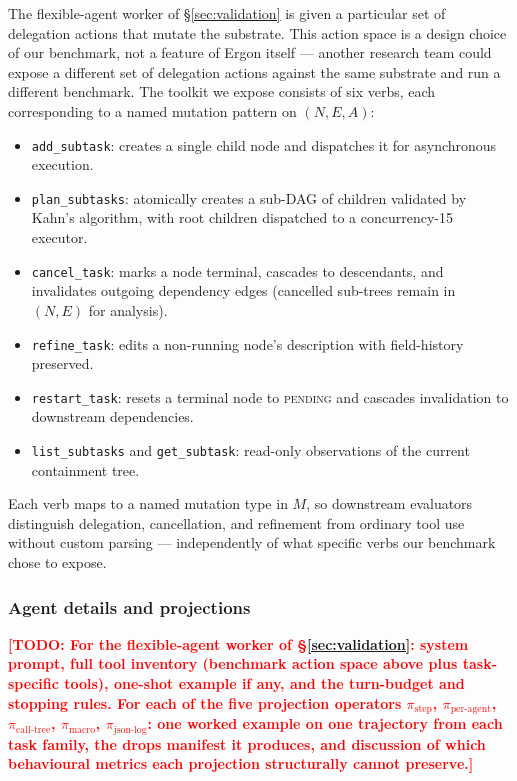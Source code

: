 \documentclass{article}
\newcommand{\todo}[1]{\textcolor{red}{\textbf{[TODO: #1]}}}
\begin{document}
The flexible-agent worker of \S\ref{sec:validation} is given a
particular set of delegation actions that mutate the substrate.
This action space is a design choice of our benchmark, not a
feature of Ergon itself --- another research team could expose a
different set of delegation actions against the same substrate
and run a different benchmark. The toolkit we expose consists of
six verbs, each corresponding to a named mutation pattern on
$(N, E, A)$:
\begin{itemize}\itemsep 0pt
  \item \texttt{add\_subtask}: creates a single child node and
    dispatches it for asynchronous execution.
  \item \texttt{plan\_subtasks}: atomically creates a sub-DAG of
    children validated by Kahn's algorithm, with root children
    dispatched to a concurrency-15 executor.
  \item \texttt{cancel\_task}: marks a node terminal, cascades to
    descendants, and invalidates outgoing dependency edges
    (cancelled sub-trees remain in $(N, E)$ for analysis).
  \item \texttt{refine\_task}: edits a non-running node's
    description with field-history preserved.
  \item \texttt{restart\_task}: resets a terminal node to
    \textsc{pending} and cascades invalidation to downstream
    dependencies.
  \item \texttt{list\_subtasks} and \texttt{get\_subtask}:
    read-only observations of the current containment tree.
\end{itemize}
Each verb maps to a named mutation type in $M$, so downstream
evaluators distinguish delegation, cancellation, and refinement
from ordinary tool use without custom parsing --- independently
of what specific verbs our benchmark chose to expose.

\subsubsection{Agent details and projections}

\todo{For the flexible-agent worker of \S\ref{sec:validation}:
system prompt, full tool inventory (benchmark action space above
plus task-specific tools), one-shot example if any, and the
turn-budget and stopping rules. For each of the five projection
operators $\pi_{\text{step}}$, $\pi_{\text{per-agent}}$,
$\pi_{\text{call-tree}}$, $\pi_{\text{macro}}$,
$\pi_{\text{json-log}}$: one worked example on one trajectory
from each task family, the drops manifest it produces, and
discussion of which behavioural metrics each projection
structurally cannot preserve.}
\end{document}

